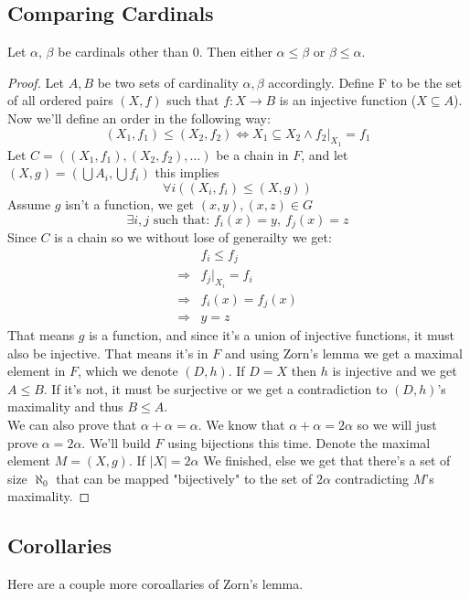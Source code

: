 \documentclass[11pt,a4paper]{article}
\begin{document}
\subsection{Comparing Cardinals}
\begin{proposition}
  Let $\alpha$, $\beta$ be cardinals other than $0$.
  Then either $\alpha \le \beta$ or $\beta \le \alpha$.
\end{proposition}
\begin{proof}
Let $A,B$ be two sets of cardinality $\alpha, \beta$ accordingly.
Define F to be the set of all ordered pairs $(X,f)$ such that 
$f \colon X \to B$ is an injective function ($X\subseteq A$).
Now we'll define an order in the following way:
\[
	(X_1,f_1) \le (X_2,f_2) \iff X_1 \subseteq X_2 \land f_2|_{X_1}=f_1
\]
Let $C=((X_1,f_1),(X_2,f_2),\ldots)$ be a chain in $F$, and let 
$(X,g) = (\bigcup A_{i},\bigcup f_i)$ this implies
\[
	\forall i((X_i,f_i)\le(X,g))
\]
Assume $g$ isn't a function, we get $(x,y),(x,z)\in G$
\[ 
	\exists i,j \text{ such that: } f_i(x)=y,\ f_j(x)=z
\]
Since $C$ is a chain so we without lose of generailty we get:
\begin{align*}
&f_i\le f_j \\
\Rightarrow &f_j|_{X_i}=f_i \\
\Rightarrow &f_i(x)=f_j(x) \\
\Rightarrow &y=z
\end{align*}
\noindent That means $g$ is a function, and since it's a union of 
injective functions, it must also be injective. That means it's 
in $F$ and using Zorn's lemma we get a maximal element in $F$, 
which we denote $(D,h)$. If $D=X$ then $h$ is injective and we 
get $A \le B$. If it's not, it must be surjective or we get a 
contradiction to $(D,h)$'s maximality and thus $B\le A$. \\
We can also prove that $\alpha+\alpha=\alpha$. 
We know that $\alpha+\alpha=2\alpha$ so we will just prove 
$\alpha=2\alpha$. We'll build $F$ using bijections this time. 
Denote the maximal element $M=(X,g)$. If $|X|=2\alpha$ We finished, 
else we get that there's a set of size $\aleph_0$ that can be 
mapped "bijectively" to the set of $2\alpha$ contradicting $M$'s maximality.
\end{proof}

\subsection{Corollaries}
Here are a couple more coroallaries of Zorn's lemma.
\end{document}
